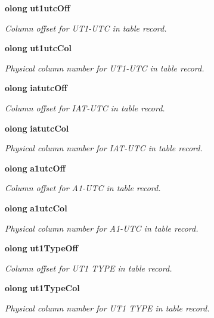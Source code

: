 \begin{CompactItemize}
{\bf olong} {\bf ut1utc\-Off}
\begin{CompactList}\small\item\em Column offset for UT1-UTC in table record. \item\end{CompactList}\item 
{\bf olong} {\bf ut1utc\-Col}
\begin{CompactList}\small\item\em Physical column number for UT1-UTC in table record. \item\end{CompactList}\item 
{\bf olong} {\bf iatutc\-Off}
\begin{CompactList}\small\item\em Column offset for IAT-UTC in table record. \item\end{CompactList}\item 
{\bf olong} {\bf iatutc\-Col}
\begin{CompactList}\small\item\em Physical column number for IAT-UTC in table record. \item\end{CompactList}\item 
{\bf olong} {\bf a1utc\-Off}
\begin{CompactList}\small\item\em Column offset for A1-UTC in table record. \item\end{CompactList}\item 
{\bf olong} {\bf a1utc\-Col}
\begin{CompactList}\small\item\em Physical column number for A1-UTC in table record. \item\end{CompactList}\item 
{\bf olong} {\bf ut1Type\-Off}
\begin{CompactList}\small\item\em Column offset for UT1 TYPE in table record. \item\end{CompactList}\item 
{\bf olong} {\bf ut1Type\-Col}
\begin{CompactList}\small\item\em Physical column number for UT1 TYPE in table record. \item\end{CompactList}\item 

\end{CompactItemize}
